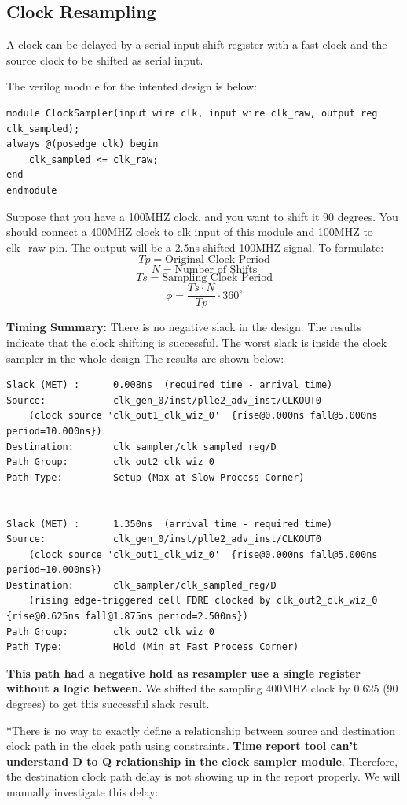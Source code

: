 \documentclass{report}
\begin{document}
\subsection{Clock Resampling}
A clock can be delayed by a serial input shift register with a fast clock and the source clock to be shifted as serial input.

The verilog module for the intented design is below:
\begin{verbatim}
module ClockSampler(input wire clk, input wire clk_raw, output reg clk_sampled);
always @(posedge clk) begin
    clk_sampled <= clk_raw;
end
endmodule
\end{verbatim}
Suppose that you have a 100MHZ clock, and you want to shift it 90 degrees. You should connect a 400MHZ clock to clk input of this module and 100MHZ to clk\_raw pin. The output will be a 2.5ns shifted 100MHZ signal. To formulate:
\[Tp = \text{Original Clock Period}\]
\[N = \text{Number of Shifts}\]
\[Ts = \text{Sampling Clock Period}\]
\[\phi = \frac{Ts \cdot N}{Tp} \cdot 360^\circ\]

\textbf{Timing Summary:}
There is no negative slack in the design. The results indicate that the clock shifting is successful. The worst slack is inside the clock sampler in the whole design The results are shown below:
\begin{verbatim}
Slack (MET) :      0.008ns  (required time - arrival time)
Source:            clk_gen_0/inst/plle2_adv_inst/CLKOUT0
    (clock source 'clk_out1_clk_wiz_0'  {rise@0.000ns fall@5.000ns period=10.000ns})
Destination:       clk_sampler/clk_sampled_reg/D
Path Group:        clk_out2_clk_wiz_0
Path Type:         Setup (Max at Slow Process Corner)


Slack (MET) :      1.350ns  (arrival time - required time)
Source:            clk_gen_0/inst/plle2_adv_inst/CLKOUT0
    (clock source 'clk_out1_clk_wiz_0'  {rise@0.000ns fall@5.000ns period=10.000ns})
Destination:       clk_sampler/clk_sampled_reg/D
    (rising edge-triggered cell FDRE clocked by clk_out2_clk_wiz_0  {rise@0.625ns fall@1.875ns period=2.500ns})
Path Group:        clk_out2_clk_wiz_0
Path Type:         Hold (Min at Fast Process Corner)
\end{verbatim}
\textbf{This path had a negative hold as resampler use a single register without a logic between.} We shifted the sampling 400MHZ clock by 0.625 (90 degrees) to get this successful slack result.

*There is no way to exactly define a relationship between source and destination clock path in the clock path using constraints. \textbf{Time report tool can't understand D to Q relationship in the clock sampler module}. Therefore, the destination clock path delay is not showing up in the report properly. We will manually investigate this delay:
\end{document}
